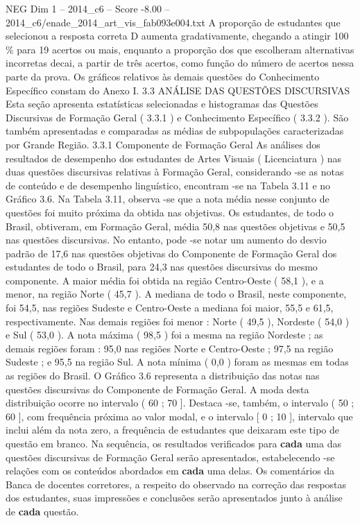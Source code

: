 \begin{textsample}{NEG Dim 1 – 2014\_c6 – Score -8.00 – 2014\_c6/enade\_2014\_art\_vis\_fab093e004.txt}
A proporção de estudantes que selecionou a resposta correta D aumenta gradativamente, chegando a atingir 100 \% para 19 acertos ou mais, enquanto a proporção dos que escolheram alternativas incorretas decai, a partir de três acertos, como função do número de acertos nessa parte da prova.
Os gráficos relativos às demais questões do Conhecimento Específico constam do Anexo I. 3.3 ANÁLISE DAS QUESTÕES DISCURSIVAS Esta seção apresenta estatísticas selecionadas e histogramas das Questões Discursivas de Formação Geral ( 3.3.1 ) e Conhecimento Específico ( 3.3.2 ).
São também apresentadas e comparadas as médias de subpopulações caracterizadas por Grande Região. 3.3.1 Componente de Formação Geral As análises dos resultados de desempenho dos estudantes de Artes Visuais ( Licenciatura ) nas duas questões discursivas relativas à Formação Geral, considerando -se as notas de conteúdo e de desempenho linguístico, encontram -se na Tabela 3.11 e no Gráfico 3.6.
Na Tabela 3.11, observa -se que a nota média nesse conjunto de questões foi muito próxima da obtida nas objetivas.
Os estudantes, de todo o Brasil, obtiveram, em Formação Geral, média 50,8 nas questões objetivas e 50,5 nas questões discursivas.
No entanto, pode -se notar um aumento do desvio padrão de 17,6 nas questões objetivas do Componente de Formação Geral dos estudantes de todo o Brasil, para 24,3 nas questões discursivas do mesmo componente.
A maior média foi obtida na região Centro-Oeste ( 58,1 ), e a menor, na região Norte ( 45,7 ).
A mediana de todo o Brasil, neste componente, foi 54,5, nas regiões Sudeste e Centro-Oeste a mediana foi maior, 55,5 e 61,5, respectivamente.
Nas demais regiões foi menor : Norte ( 49,5 ), Nordeste ( 54,0 ) e Sul ( 53,0 ).
A nota máxima ( 98,5 ) foi a mesma na região Nordeste ; as demais regiões foram : 95,0 nas regiões Norte e Centro-Oeste ; 97,5 na região Sudeste ; e 95,5 na região Sul.
A nota mínima ( 0,0 ) foram as mesmas em todas as regiões do Brasil.
O Gráfico 3.6 representa a distribuição das notas nas questões discursivas do Componente de Formação Geral.
A moda desta distribuição ocorre no intervalo ( 60 ; 70 ].
Destaca -se, também, o intervalo ( 50 ; 60 ], com frequência próxima ao valor modal, e o intervalo [ 0 ; 10 ], intervalo que inclui além da nota zero, a frequência de estudantes que deixaram este tipo de questão em branco.
Na sequência, os resultados verificados para \textbf{cada} uma das questões discursivas de Formação Geral serão apresentados, estabelecendo -se relações com os conteúdos abordados em \textbf{cada} uma delas.
Os comentários da Banca de docentes corretores, a respeito do observado na correção das respostas dos estudantes, suas impressões e conclusões serão apresentados junto à análise de \textbf{cada} questão.

\end{textsample}
